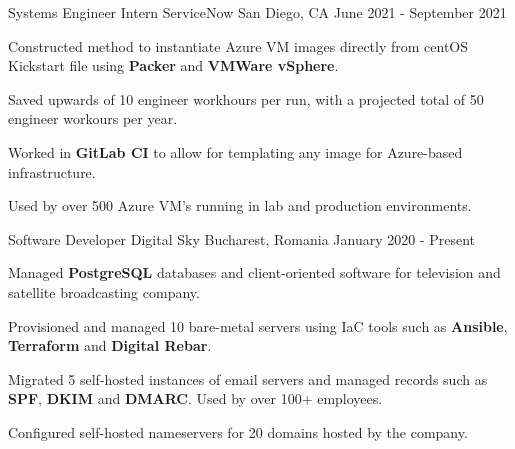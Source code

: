 \begin{cventries}
  \cventry
    {Systems Engineer Intern}
    {ServiceNow}
    {San Diego, CA}
    {June 2021 - September 2021}
    {
      \begin{cvitems}
        \item {Constructed method to instantiate Azure VM images directly from centOS Kickstart file using \textbf{Packer} and \textbf{VMWare vSphere}.}
        \item {Saved upwards of 10 engineer workhours per run, with a projected total of 50 engineer workours per year.}
        \item {Worked in \textbf{GitLab CI} to allow for templating any image for Azure-based infrastructure.}
        \item {Used by over 500 Azure VM's running in lab and production environments.}
      \end{cvitems}
    }
  \cventry
    {Software Developer}
    {Digital Sky}
    {Bucharest, Romania}
    {January 2020 - Present}
    {
      \begin{cvitems}
        \item {Managed \textbf{PostgreSQL} databases and client-oriented software for television and satellite broadcasting company.}
        \item {Provisioned and managed 10 bare-metal servers using IaC tools such as \textbf{Ansible}, \textbf{Terraform} and \textbf{Digital Rebar}.}
        \item {Migrated 5 self-hosted instances of email servers and managed records such as \textbf{SPF}, \textbf{DKIM} and \textbf{DMARC}. Used by over 100+ employees.}
        \item {Configured self-hosted nameservers for 20 domains hosted by the company.}
      \end{cvitems}
    }
\end{cventries}
